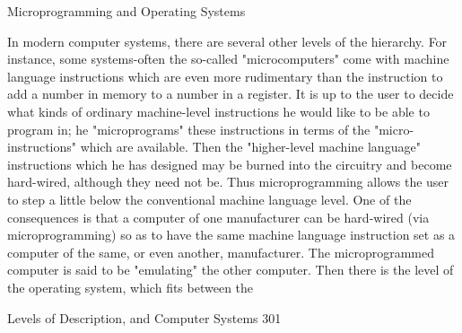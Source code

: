                          Microprogramming and Operating Systems

       In modern computer systems, there are several other levels of the hierarchy. For
       instance, some systems-often the so-called "microcomputers" come with machine
       language instructions which are even more rudimentary than the instruction to add
       a number in memory to a number in a register. It is up to the user to decide what
       kinds of ordinary machine-level instructions he would like to be able to program
       in; he "microprograms" these instructions in terms of the "micro-instructions"
       which are available. Then the "higher-level machine language" instructions which
       he has designed may be burned into the circuitry and become hard-wired,
       although they need not be. Thus microprogramming allows the user to step a little
       below the conventional machine language level. One of the consequences is that a
       computer of one manufacturer can be hard-wired (via microprogramming) so as
       to have the same machine language instruction set as a computer of the same, or
       even another, manufacturer. The microprogrammed computer is said to be
       "emulating" the other computer. Then there is the level of the operating system,
       which fits between the

Levels of Description, and Computer Systems                                              301

